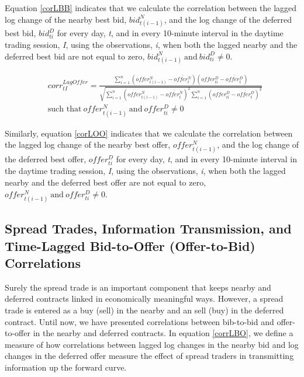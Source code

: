 \documentclass[]{elsarticle} %
\begin{document}
Equation \ref{corLBB} indicates that we calculate the correlation
between the lagged log change of the nearby best bid,
\(bid_{t(i-1)}^N\), and the log change of the deferred best bid,
\(bid_{ti}^D\) for every day, \emph{t}, and in every 10-minute interval
in the daytime trading session, \emph{I}, using the observations,
\emph{i}, when both the lagged nearby and the deferred best bid are not
equal to zero,
\({bid_{t(i-1)}^N \: \textrm{and} \: bid_{ti}^D} \neq 0\).

\begin{equation} \label{corLOO}
\begin{split}
& corr^{LagOffer}_{tI}  = \frac{\sum\limits_{i=1}^{n} \left(offer_{t(i-1)}^N - \overline{offer_t^N}\right) \left(offer_{ti}^D - \overline{offer_t^D}\right)}{\sqrt{\sum\limits_{i=1}^{n} \left(offer_{t(i-1)}^N - \overline{offer_t^N}\right)^2 \sum\limits_{i=1}^{n}\left(offer_{ti}^D - \overline{offer_t^D}\right)^2}} \\
& \textrm{such that} \: {offer_{t(i-1)}^N \: \textrm{and} \: offer_{ti}^D} \neq 0
\end{split}
\end{equation}

Similarly, equation \ref{corLOO} indicates that we calculate the
correlation between the lagged log change of the nearby best offer,
\(offer_{t(i-1)}^N\), and the log change of the deferred best offer,
\(offer_{ti}^D\) for every day, \emph{t}, and in every 10-minute
interval in the daytime trading session, \emph{I}, using the
observations, \emph{i}, when both the lagged nearby and the deferred
best offer are not equal to zero,
\({offer_{t(i-1)}^N \: \textrm{and} \: offer_{ti}^D} \neq 0\).

\subsection{Spread Trades, Information Transmission, and Time-Lagged
Bid-to-Offer (Offer-to-Bid)
Correlations}\label{spread-trades-information-transmission-and-time-lagged-bid-to-offer-offer-to-bid-correlations}

Surely the spread trade is an important component that keeps nearby and
deferred contracts linked in economically meaningful ways. However, a
spread trade is entered as a buy (sell) in the nearby and an sell (buy)
in the deferred contract. Until now, we have presented correlations
between bib-to-bid and offer-to-offer in the nearby and deferred
contracts. In equation \ref{corrLBO}, we define a measure of how
correlations between lagged log changes in the nearby bid and log
changes in the deferred offer measure the effect of spread traders in
transmitting information up the forward curve.
\end{document}
